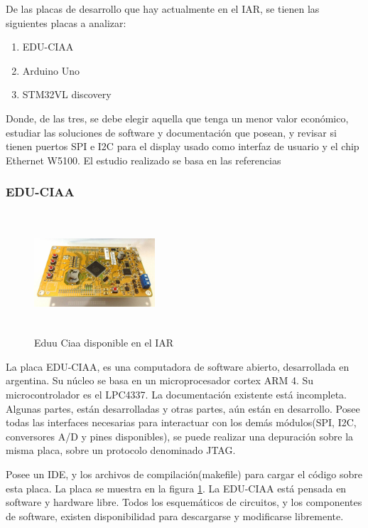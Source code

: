  De las placas de desarrollo que hay actualmente en el IAR, se tienen las siguientes placas a analizar: 
 
\begin{enumerate}
	\item EDU-CIAA
	\item Arduino Uno 
	\item STM32VL discovery 
\end{enumerate}
Donde, de las tres, se debe elegir aquella que tenga un menor valor económico, estudiar las soluciones de software y documentación que posean, y revisar si tienen puertos SPI e I2C para el display usado como interfaz de usuario y el chip Ethernet W5100. El estudio realizado se basa en las referencias \cite{placastm32vl,arduno,eduuciaaa}  

\subsubsection{EDU-CIAA}

\begin{figure}
	\includegraphics[width=0.4\textwidth , height=  45mm]{edu_ciaa}
	\caption{Eduu Ciaa disponible en el IAR}
	\label{fig:edu_ciaa}
\end{figure}
La placa EDU-CIAA, es una computadora de software abierto, desarrollada en argentina. Su núcleo se basa en un microprocesador cortex ARM 4. Su microcontrolador es el LPC4337. La documentación existente está incompleta. Algunas partes, están desarrolladas y otras partes, aún están en desarrollo. Posee todas las interfaces necesarias para interactuar con los demás módulos(SPI, I2C, conversores A/D y pines disponibles), se puede realizar una depuración sobre la misma placa, sobre un protocolo denominado JTAG. 


Posee un IDE, y los archivos de compilación(makefile) para cargar el código sobre esta placa. La placa se muestra en la figura \ref{fig:edu_ciaa}. La EDU-CIAA está pensada en software y hardware libre. Todos los esquemáticos de circuitos, y los componentes de software, existen disponibilidad para descargarse y modificarse libremente. 


